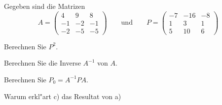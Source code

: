 Gegeben sind die Matrizen
\[
A
=
\begin{pmatrix}
 4& 9& 8\\
-1&-2&-1\\
-2&-5&-5
\end{pmatrix}
\qquad\text{und}\qquad
P
=
\begin{pmatrix}
-7&-16&-8\\
 1&  3& 1\\
 5& 10& 6
\end{pmatrix}
\]
\begin{teilaufgaben}
\item Berechnen Sie $P^2$.
\item Berechnen Sie die Inverse $A^{-1}$ von $A$.
\item Berechnen Sie $P_0=A^{-1}PA$.
\item Warum erkl"art c) das Resultat von a)
\end{teilaufgaben}

